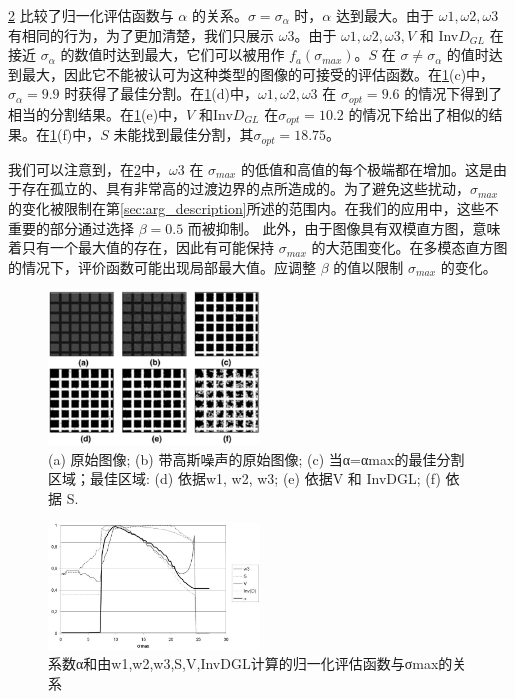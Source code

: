 \cref{fig:评估函数} 比较了归一化评估函数与 $\alpha$ 的关系。$\sigma = \sigma_{\alpha}$ 时，$\alpha$ 达到最大。由于 $\omega1,\omega2,\omega3$ 有相同的行为，为了更加清楚，我们只展示 $\omega3$。由于 $\omega1,\omega2,\omega3,V$ 和 Inv$D_{GL}$ 在接近 $\sigma_{\alpha}$ 的数值时达到最大，它们可以被用作 $f_{a}(\sigma_{max})$。$S$ 在 $\sigma \neq \sigma_{\alpha}$ 的值时达到最大，因此它不能被认可为这种类型的图像的可接受的评估函数。在\cref{fig:人工图像测试}(c)中，$\sigma_{\alpha} = 9.9$ 时获得了最佳分割。在\cref{fig:人工图像测试}(d)中，$\omega1,\omega2,\omega3$ 在 $\sigma_{opt} = 9.6$ 的情况下得到了相当的分割结果。在\cref{fig:人工图像测试}(e)中，$V$ 和Inv$D_{GL}$ 在$\sigma_{opt} = 10.2$ 的情况下给出了相似的结果。在\cref{fig:人工图像测试}(f)中，$S$ 未能找到最佳分割，其$\sigma_{opt} = 18.75$。

我们可以注意到，在\cref{fig:评估函数}中，$\omega3$ 在 $\sigma_{max}$ 的低值和高值的每个极端都在增加。这是由于存在孤立的、具有非常高的过渡边界的点所造成的。为了避免这些扰动，$\sigma_{max}$ 的变化被限制在第\cref{sec:arg_description}所述的范围内。在我们的应用中，这些不重要的部分通过选择 $\beta=0.5$ 而被抑制。 此外，由于图像具有双模直方图，意味着只有一个最大值的存在，因此有可能保持 $\sigma_{max}$ 的大范围变化。在多模态直方图的情况下，评价函数可能出现局部最大值。应调整 $\beta$ 的值以限制 $\sigma_{max}$ 的变化。

\begin{figure}[htbp]
    \centering
    \includegraphics[width=0.5\textwidth]{figures/人工图像测试.png}
    \caption{(a) 原始图像; (b) 带高斯噪声的原始图像; (c) 当α=αmax的最佳分割区域；最佳区域: (d) 依据w1, w2, w3; (e) 依据V 和 InvDGL; (f) 依据 S.}
    \label{fig:人工图像测试}
\end{figure}

\begin{figure}[htbp]
    \centering
    \includegraphics[width=0.5\textwidth]{figures/评估函数.png}
    \caption{系数α和由w1,w2,w3,S,V,InvDGL计算的归一化评估函数与σmax的关系}
    \label{fig:评估函数}
\end{figure}
